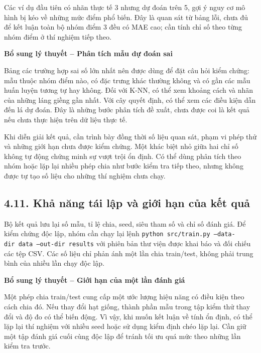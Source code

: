 \documentclass[12pt,a4paper,oneside]{article}
\begin{document}
Các ví dụ đầu tiên có nhãn thực tế 3 nhưng dự đoán trên 5, gợi ý nguy cơ
mô hình bị kéo về những mức điểm phổ biến. Đây là quan sát từ bảng lỗi,
chưa đủ để kết luận toàn bộ nhóm điểm 3 đều có MAE cao; cần tính chỉ số
theo từng nhóm điểm ở thí nghiệm tiếp theo.


\par\noindent\textbf{Bổ sung lý thuyết -- Phân tích mẫu dự đoán sai}\par
Bảng các trường hợp sai số lớn nhất nên được dùng để đặt câu hỏi kiểm chứng: mẫu thuộc nhóm điểm nào, có đặc trưng khác thường không và có gần các mẫu huấn luyện tương tự hay không. Đối với K-NN, có thể xem khoảng cách và nhãn của những láng giềng gần nhất. Với cây quyết định, có thể xem các điều kiện dẫn đến lá dự đoán. Đây là những bước phân tích đề xuất, chưa được coi là kết quả nếu chưa thực hiện trên dữ liệu thực tế.\par

Khi diễn giải kết quả, cần trình bày đồng thời số liệu quan sát, phạm vi phép thử và những giới hạn chưa được kiểm chứng. Một khác biệt nhỏ giữa hai chỉ số không tự động chứng minh sự vượt trội ổn định. Có thể dùng phân tích theo nhóm hoặc lặp lại nhiều phép chia như bước kiểm tra tiếp theo, nhưng không được tự tạo số liệu cho những thí nghiệm chưa chạy.\par

\subsection*{4.11. Khả năng tái lập và giới hạn của kết quả}

Bộ kết quả lưu lại số mẫu, tỉ lệ chia, seed, siêu tham số và chỉ số đánh
giá. Để kiểm chứng độc lập, nhóm cần chạy lại lệnh
\texttt{python\ src/train.py\ –data-dir\ data\ –out-dir\ results} với
phiên bản thư viện được khai báo và đối chiếu các tệp CSV. Các số liệu
chỉ phản ánh một lần chia train/test, không phải trung bình của nhiều
lần chạy độc lập.


\par\noindent\textbf{Bổ sung lý thuyết -- Giới hạn của một lần đánh giá}\par
Một phép chia train/test cung cấp một ước lượng hiệu năng có điều kiện theo cách chia đó. Nếu thay đổi hạt giống, thành phần mẫu trong tập kiểm thử thay đổi và độ đo có thể biến động. Vì vậy, khi muốn kết luận về tính ổn định, có thể lặp lại thí nghiệm với nhiều seed hoặc sử dụng kiểm định chéo lặp lại. Cần giữ một tập đánh giá cuối cùng độc lập để tránh tối ưu quá mức theo những lần kiểm tra trước.\par
\end{document}
